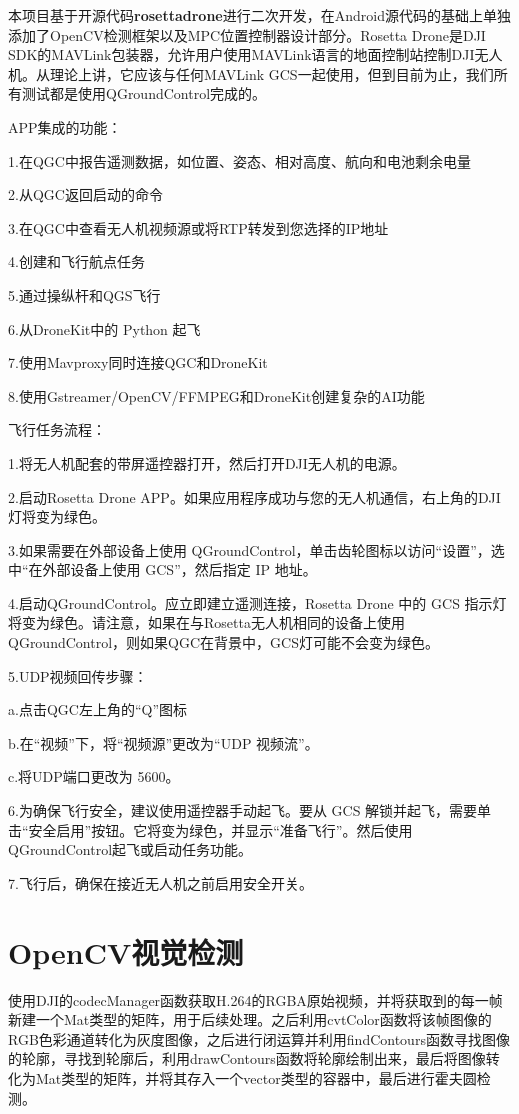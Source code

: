 本项目基于开源代码\textbf{rosettadrone}进行二次开发，在Android源代码的基础上单独添加了OpenCV检测框架以及MPC位置控制器设计部分\cite{ArtE11}。Rosetta Drone是DJI SDK的MAVLink包装器，允许用户使用MAVLink语言的地面控制站控制DJI无人机。从理论上讲，它应该与任何MAVLink GCS一起使用，但到目前为止，我们所有测试都是使用QGroundControl完成的。\cite{ArtE12}

APP集成的功能：

1.在QGC中报告遥测数据，如位置、姿态、相对高度、航向和电池剩余电量

2.从QGC返回启动的命令

3.在QGC中查看无人机视频源或将RTP转发到您选择的IP地址

4.创建和飞行航点任务

5.通过操纵杆和QGS飞行

6.从DroneKit中的 Python 起飞

7.使用Mavproxy同时连接QGC和DroneKit

8.使用Gstreamer/OpenCV/FFMPEG和DroneKit创建复杂的AI功能

飞行任务流程：

1.将无人机配套的带屏遥控器打开，然后打开DJI无人机的电源。

2.启动Rosetta Drone APP。如果应用程序成功与您的无人机通信，右上角的DJI灯将变为绿色。

3.如果需要在外部设备上使用 QGroundControl，单击齿轮图标以访问“设置”，选中“在外部设备上使用 GCS”，然后指定 IP 地址。

4.启动QGroundControl。应立即建立遥测连接，Rosetta Drone 中的 GCS 指示灯将变为绿色。请注意，如果在与Rosetta无人机相同的设备上使用QGroundControl，则如果QGC在背景中，GCS灯可能不会变为绿色。

5.UDP视频回传步骤：

a.点击QGC左上角的“Q”图标

b.在“视频”下，将“视频源”更改为“UDP 视频流”。

c.将UDP端口更改为 5600。

6.为确保飞行安全，建议使用遥控器手动起飞。要从 GCS 解锁并起飞，需要单击“安全启用”按钮。它将变为绿色，并显示“准备飞行”。然后使用QGroundControl起飞或启动任务功能。

7.飞行后，确保在接近无人机之前启用安全开关。

\section{OpenCV视觉检测}

使用DJI的codecManager函数获取H.264的RGBA原始视频，并将获取到的每一帧新建一个Mat类型的矩阵，用于后续处理。之后利用cvtColor函数将该帧图像的RGB色彩通道转化为灰度图像，之后进行闭运算并利用findContours函数寻找图像的轮廓，寻找到轮廓后，利用drawContours函数将轮廓绘制出来，最后将图像转化为Mat类型的矩阵，并将其存入一个vector类型的容器中，最后进行霍夫圆检测。

